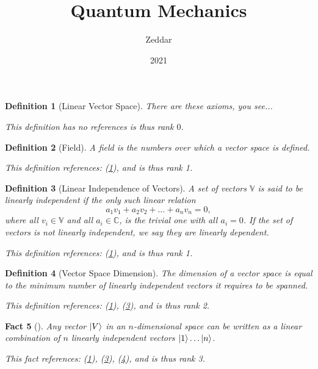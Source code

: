 \documentclass{article}
\title{Quantum Mechanics}
\author{Zeddar}
\date{2021}
\newtheorem{definition}{Definition}
\newtheorem{fact}[definition]{Fact}
\begin{document}
\maketitle

\begin{tcolorbox}[title=Definition: Linear Vector Space]\begin{definition}[Linear Vector Space]\label{0}There are these axioms, you see...
 
 This definition has no references is thus rank $0$.\end{definition}\end{tcolorbox}
\begin{tcolorbox}[title=Definition: Field]\begin{definition}[Field]\label{1}A field is the numbers over which a vector space is defined.
 
 This definition references: (\ref{0}), and is thus rank 1.\end{definition}\end{tcolorbox}
\begin{tcolorbox}[title=Definition: Linear Independence of Vectors]\begin{definition}[Linear Independence of Vectors]\label{2}A set of vectors $\mathbb{V}$ is said to be linearly independent if the only such
linear relation $$a_1v_1+a_2v_2+\ldots+a_nv_n=0,$$ where all $v_i\in\mathbb{V}$ and all
$a_i\in\mathbb{C}$, is the trivial one with all $a_i = 0$. If the set of vectors
is not linearly independent, we say they are linearly dependent. 
 
 This definition references: (\ref{0}), and is thus rank 1.\end{definition}\end{tcolorbox}
\begin{tcolorbox}[title=Definition: Vector Space Dimension]\begin{definition}[Vector Space Dimension]\label{3}The dimension of a vector space is equal to the minimum number of linearly independent vectors it requires to be spanned.
 
 This definition references: (\ref{0}), (\ref{2}), and is thus rank 2.\end{definition}\end{tcolorbox}
\begin{tcolorbox}[title=Fact]\begin{fact}[]\label{4}Any vector $\ket{V}$ in an $n$-dimensional space can be written as a
linear combination of $n$ linearly independent vectors $\ket{1}\ldots\ket{n}$.
 
 This fact references: (\ref{0}), (\ref{2}), (\ref{3}), and is thus rank 3.\end{fact}\end{tcolorbox}
\end{document}
